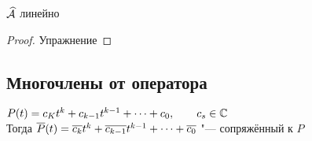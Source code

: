 \begin{property}
	$ \widehat{\mathcal{A}} $ линейно
\end{property}

\begin{proof}
	Упражнение
\end{proof}

\subsection{Многочлены от оператора}

\begin{notation}
	$ P(t) = c_Kt^k + c_{k - 1}t^{k - 1} + \dots + c_0, \qquad c_s \in \mathbb{C} $ \\
	Тогда $ \overline{P}(t) = \overline{c_k}t^k + \overline{c_{k - 1}}t^{k - 1} + \dots + \overline{c_0} $ "--- сопряжённый к $ P $
\end{notation}

